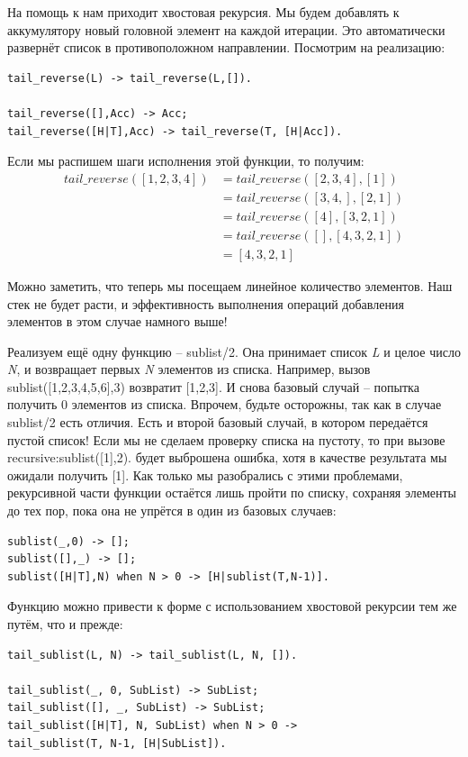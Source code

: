 \documentclass[a4paper,12pt]{report}
\newcommand{\ops}{\colorbox{lgreen}}
\begin{document}
На помощь к нам приходит хвостовая рекурсия. Мы будем добавлять к аккумулятору новый головной элемент на каждой итерации. Это автоматически развернёт список в противоположном направлении. Посмотрим на реализацию:
\begin{lstlisting}[style=erlang]
tail_reverse(L) -> tail_reverse(L,[]).
 
tail_reverse([],Acc) -> Acc;
tail_reverse([H|T],Acc) -> tail_reverse(T, [H|Acc]).
\end{lstlisting}

Если мы распишем шаги исполнения этой функции, то получим:
\begin{align*}
tail\_reverse([1,2,3,4]) &= tail\_reverse([2,3,4], [1])\\
&= tail\_reverse([3,4,], [2,1])\\
&= tail\_reverse([4], [3,2,1])\\
&= tail\_reverse([], [4,3,2,1])\\
&= [4,3,2,1]
\end{align*}

Можно заметить, что теперь мы посещаем линейное количество элементов. Наш стек не будет расти, и эффективность выполнения операций добавления элементов в этом случае намного выше!

Реализуем ещё одну функцию \--- \ops{sublist/2}. Она принимает список \emph{L} и целое число \emph{N}, и возвращает первых \emph{N} элементов из списка. Например, вызов \ops{sublist([1,2,3,4,5,6],3)} возвратит [1,2,3]. И снова базовый случай \--- попытка получить 0 элементов из списка. Впрочем, будьте осторожны, так как в случае \ops{sublist/2} есть отличия. Есть и второй базовый случай, в котором передаётся пустой список! Если мы не сделаем проверку списка на пустоту, то при вызове \ops{recursive:sublist([1],2).} будет выброшена ошибка, хотя в качестве результата мы ожидали получить \ops{[1]}. Как только мы разобрались с этими проблемами, рекурсивной части функции остаётся лишь пройти по списку, сохраняя элементы до тех пор, пока она не упрётся в один из базовых случаев:
\begin{lstlisting}[style=erlang]
sublist(_,0) -> [];
sublist([],_) -> [];
sublist([H|T],N) when N > 0 -> [H|sublist(T,N-1)].
\end{lstlisting}

Функцию можно привести к форме с использованием хвостовой рекурсии тем же путём, что и прежде:
\begin{lstlisting}[style=erlang]
tail_sublist(L, N) -> tail_sublist(L, N, []).
 
tail_sublist(_, 0, SubList) -> SubList;
tail_sublist([], _, SubList) -> SubList;
tail_sublist([H|T], N, SubList) when N > 0 ->
tail_sublist(T, N-1, [H|SubList]).
\end{lstlisting}
\end{document}
